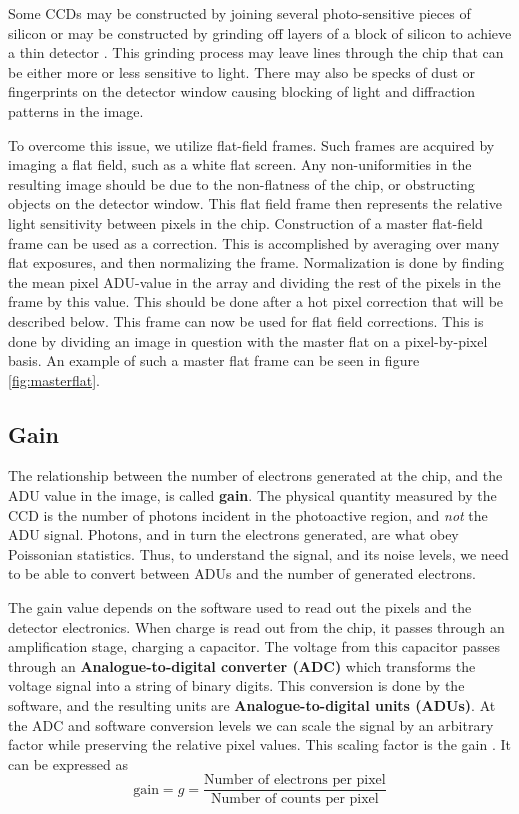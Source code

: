\documentclass[../main.tex]{subfiles}
\begin{document}
	Some CCDs may be constructed by joining several photo-sensitive pieces of silicon or may be constructed by grinding off layers of a block of silicon to achieve a thin detector \cite{CCDdatareductionguide, handbookofccdastronomy, CCDbook, ccdwiki}. This grinding process may leave lines through the chip that can be either more or less sensitive to light. There may also be specks of dust or fingerprints on the detector window causing blocking of light and diffraction patterns in the image.
	
	To overcome this issue, we utilize flat-field frames. Such frames are acquired by imaging a flat field, such as a white flat screen. Any non-uniformities in the resulting image should be due to the non-flatness of the chip, or obstructing objects on the detector window. This flat field frame then represents the relative light sensitivity between pixels in the chip. Construction of a master flat-field frame can be used as a correction. This is accomplished by averaging over many flat exposures, and then normalizing the frame. Normalization is done by finding the mean pixel ADU-value in the array and dividing the rest of the pixels in the frame by this value. This should be done after a hot pixel correction that will be described below. This frame can now be used for flat field corrections. This is done by dividing an image in question with the master flat on a pixel-by-pixel basis. An example of such a master flat frame can be seen in figure \ref{fig:masterflat}.
	
	\subsection{Gain}\label{sec:gain}
	The relationship between the number of electrons generated at the chip, and the ADU value in the image, is called \textbf{gain}\cite{handbookofccdastronomy, CCDdatareductionguide}. The physical quantity measured by the CCD is the number of photons incident in the photoactive region, and \textit{not} the ADU signal. Photons, and in turn the electrons generated, are what obey Poissonian statistics. Thus, to understand the signal, and its noise levels, we need to be able to convert between ADUs and the number of generated electrons. 
	
	The gain value depends on the software used to read out the pixels and the detector electronics. When charge is read out from the chip, it passes through an amplification stage, charging a capacitor. The voltage from this capacitor passes through an \textbf{Analogue-to-digital converter (ADC)} which transforms the voltage signal into a string of binary digits. This conversion is done by the software, and the resulting units are \textbf{Analogue-to-digital units (ADUs)}\cite{handbookofccdastronomy}. At the ADC and software conversion levels we can scale the signal by an arbitrary factor while preserving the relative pixel values. This scaling factor is the gain \cite{handbookofccdastronomy, CCDdatareductionguide}. It can be expressed as
	\begin{equation}\label{gaindef}
		\text{gain} = g = \frac{\text{Number of electrons per pixel}}{\text{Number of counts per pixel}}
	\end{equation} 
\end{document}
